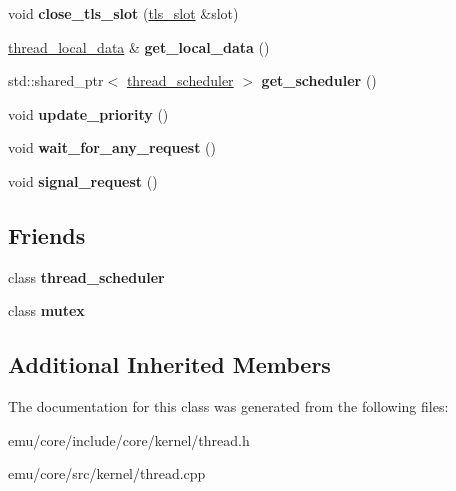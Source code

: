 \begin{DoxyCompactItemize}
void {\bfseries close\+\_\+tls\+\_\+slot} (\mbox{\hyperlink{structeka2l1_1_1kernel_1_1tls__slot}{tls\+\_\+slot}} \&slot)
\item 
\mbox{\label{classeka2l1_1_1kernel_1_1thread_a35cdea4840dc75ffeb07b75788fc2c1d}} 
\mbox{\hyperlink{structeka2l1_1_1kernel_1_1thread__local__data}{thread\+\_\+local\+\_\+data}} \& {\bfseries get\+\_\+local\+\_\+data} ()
\item 
\mbox{\label{classeka2l1_1_1kernel_1_1thread_a59fe8b77d5f109a261078f77d6b5ae7c}} 
std\+::shared\+\_\+ptr$<$ \mbox{\hyperlink{classeka2l1_1_1kernel_1_1thread__scheduler}{thread\+\_\+scheduler}} $>$ {\bfseries get\+\_\+scheduler} ()
\item 
\mbox{\label{classeka2l1_1_1kernel_1_1thread_a9c1ffa54fb1efafcf7f9fc2821010cf4}} 
void {\bfseries update\+\_\+priority} ()
\item 
\mbox{\label{classeka2l1_1_1kernel_1_1thread_a2a0988d6fa5b735e0eeb04dbb063c6a1}} 
void {\bfseries wait\+\_\+for\+\_\+any\+\_\+request} ()
\item 
\mbox{\label{classeka2l1_1_1kernel_1_1thread_af731ba6aa6edcaf8c47d86c6b1385f41}} 
void {\bfseries signal\+\_\+request} ()
\end{DoxyCompactItemize}
\subsection*{Friends}
\begin{DoxyCompactItemize}
\item 
\mbox{\label{classeka2l1_1_1kernel_1_1thread_a2e32b71e1716c0c74d4e56026f4d0a35}} 
class {\bfseries thread\+\_\+scheduler}
\item 
\mbox{\label{classeka2l1_1_1kernel_1_1thread_a6f4535025b9df015e1a7d35f4e2bbee7}} 
class {\bfseries mutex}
\end{DoxyCompactItemize}
\subsection*{Additional Inherited Members}


The documentation for this class was generated from the following files\+:\begin{DoxyCompactItemize}
\item 
emu/core/include/core/kernel/thread.\+h\item 
emu/core/src/kernel/thread.\+cpp\end{DoxyCompactItemize}
